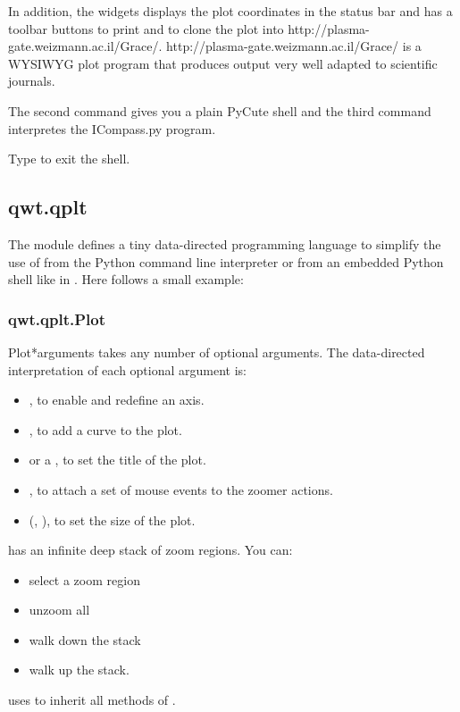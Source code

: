 \documentclass{manual}
\newcommand{\Grace}{\ulink{Grace}
  {http://plasma-gate.weizmann.ac.il/Grace/}}
\begin{document}
In addition, the  widgets displays the plot coordinates in the
status bar and has a toolbar buttons to print and to clone the plot into
\Grace{}.
\Grace{} is a WYSIWYG plot program that produces output very well adapted to
scientific journals.

The second command gives you a plain PyCute shell and the third command 
interpretes the ICompass.py program.

Type  to exit the shell.
 

\subsection{qwt.qplt \label{qwt-qplt}}

The module  defines a tiny data-directed programming
language to simplify the use of  from the Python command
line interpreter or from an embedded Python shell like in .
Here follows a small example:



\subsubsection{qwt.qplt.Plot \label{intro-qplt-plot}}

\begin{classdesc}{Plot}{*arguments}
   takes any number of optional arguments.
  The data-directed interpretation of each optional argument is:
  \begin{itemize}
  \item
    , to enable and redefine an axis.
  \item
    , to add a curve to the plot.
  \item
     or a , to set the title of the plot.
  \item
    , to attach a set of mouse events to the zoomer actions.
  \item
    (, ), to set the size of the plot.
  \end{itemize}

   has an infinite deep stack of zoom regions. You can:
  \begin{itemize}
    \item
      select a zoom region
    \item
      unzoom all
    \item
      walk down the stack
    \item
      walk up the stack.
  \end{itemize}

   uses  to inherit all methods of
  .
\end{classdesc}
\end{document}

